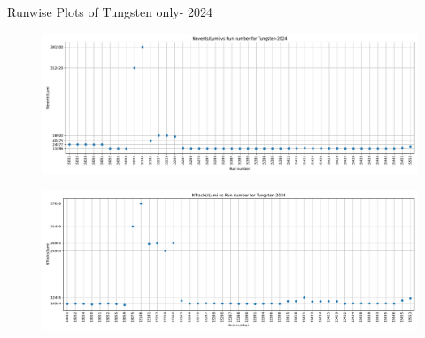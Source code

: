 \begin{frame}{Runwise Plots of Tungsten only- 2024}
    \begin{figure}
        \centering
        \includegraphics[width=1.0\textwidth]{plots_runwise/NEventsbyLumi_2024_Tungsten.pdf}
    \end{figure}
    \vspace{-0.35cm}
    \begin{figure}
        \centering
        \includegraphics[width=1.0\textwidth]{plots_runwise/NTracksbyLumi_2024_Tungsten.pdf}
    \end{figure}
\end{frame}

